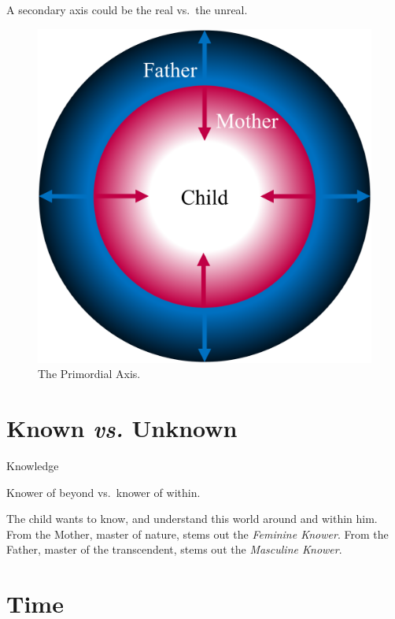 \documentclass[]{book}
\begin{document}
A secondary axis could be the real vs.~the unreal.

\begin{figure}

{\centering \includegraphics[width=\textwidth]{img/protection} 

}

\caption{The Primordial Axis.}\label{fig:unnamed-chunk-6}
\end{figure}

\hypertarget{known-vs.-unknown}{%
\section{\texorpdfstring{Known \emph{vs.} Unknown}{Known vs. Unknown}}\label{known-vs.-unknown}}

Knowledge

Knower of beyond vs.~knower of within.

The child wants to know, and understand this world around and within him. From the Mother, master of nature, stems out the \emph{Feminine Knower}. From the Father, master of the transcendent, stems out the \emph{Masculine Knower}.

\hypertarget{time}{%
\section{Time}\label{time}}
\end{document}
